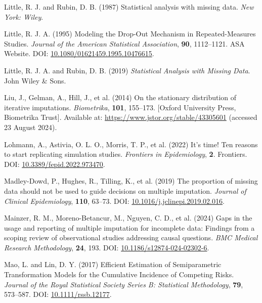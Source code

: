 \documentclass[
  letterpaper,
  paper=240mm:170mm,
  twoside=true,
  open=right,
  fontsize=10pt,
  pagesize=false,
  BCOR=15mm,
  DIV=14,
  headinclude=true,
  footinclude=false,
  headsepline=on]{scrbook}
\newlength{\cslhangindent}
\newenvironment{CSLReferences}[2] %
 {\begin{list}{}{%
  \setlength{\itemindent}{0pt}
  \setlength{\leftmargin}{0pt}
  \setlength{\parsep}{0pt}
  \ifodd #1
   \setlength{\leftmargin}{\cslhangindent}
   \setlength{\itemindent}{-1\cslhangindent}
  \fi
  \setlength{\itemsep}{#2\baselineskip}}}
 {\end{list}}
\begin{document}
\begin{CSLReferences}{1}{1}
Little, R. J. and Rubin, D. B. (1987) Statistical analysis with missing
data. \emph{New York: Wiley}.

Little, R. J. A. (1995) Modeling the {Drop-Out Mechanism} in
{Repeated-Measures Studies}. \emph{Journal of the American Statistical
Association}, \textbf{90}, 1112--1121. ASA Website. DOI:
\href{https://doi.org/10.1080/01621459.1995.10476615}{10.1080/01621459.1995.10476615}.

Little, R. J. A. and Rubin, D. B. (2019) \emph{Statistical {Analysis}
with {Missing Data}}. John Wiley \& Sons.

Liu, J., Gelman, A., Hill, J., et al. (2014) On the stationary
distribution of iterative imputations. \emph{Biometrika}, \textbf{101},
155--173. {[}Oxford University Press, Biometrika Trust{]}. Available at:
\url{https://www.jstor.org/stable/43305601} (accessed 23 August 2024).

Lohmann, A., Astivia, O. L. O., Morris, T. P., et al. (2022) It's time!
{Ten} reasons to start replicating simulation studies. \emph{Frontiers
in Epidemiology}, \textbf{2}. Frontiers. DOI:
\href{https://doi.org/10.3389/fepid.2022.973470}{10.3389/fepid.2022.973470}.

Madley-Dowd, P., Hughes, R., Tilling, K., et al. (2019) The proportion
of missing data should not be used to guide decisions on multiple
imputation. \emph{Journal of Clinical Epidemiology}, \textbf{110},
63--73. DOI:
\href{https://doi.org/10.1016/j.jclinepi.2019.02.016}{10.1016/j.jclinepi.2019.02.016}.

Mainzer, R. M., Moreno-Betancur, M., Nguyen, C. D., et al. (2024) Gaps
in the usage and reporting of multiple imputation for incomplete data:
Findings from a scoping review of observational studies addressing
causal questions. \emph{BMC Medical Research Methodology}, \textbf{24},
193. DOI:
\href{https://doi.org/10.1186/s12874-024-02302-6}{10.1186/s12874-024-02302-6}.

Mao, L. and Lin, D. Y. (2017) Efficient {Estimation} of {Semiparametric
Transformation Models} for the {Cumulative Incidence} of {Competing
Risks}. \emph{Journal of the Royal Statistical Society Series B:
Statistical Methodology}, \textbf{79}, 573--587. DOI:
\href{https://doi.org/10.1111/rssb.12177}{10.1111/rssb.12177}.


\end{CSLReferences}
\end{document}
